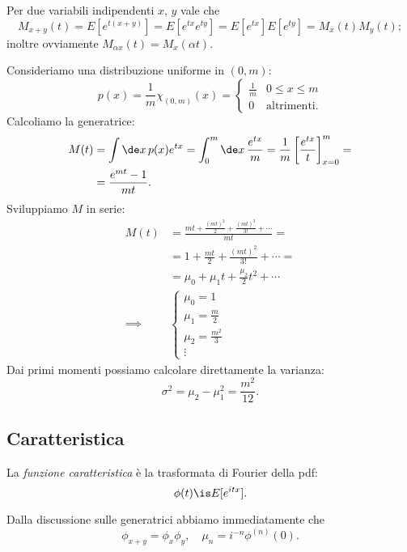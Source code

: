 Per due variabili indipendenti $x$, $y$ vale che
\begin{equation*}
	M_{x+y}(t) =
	E[e^{t(x+y)}] =
	E[e^{tx} e^{ty}] =
	E[e^{tx}] E[e^{ty}] =
	M_x(t) M_y(t);
\end{equation*}
inoltre ovviamente $M_{\alpha x}(t) = M_x(\alpha t)$.

\begin{example}
	Consideriamo una distribuzione uniforme in $(0,m)$:
	\begin{equation*}
		p(x) = \frac1m \chi_{(0,m)}(x) = \begin{cases}
			\frac 1m & 0 \le x \le m \\
			0  & \text{altrimenti.}
		\end{cases}
	\end{equation*}
	Calcoliamo la generatrice:
	\begin{align*}
		M(t) &= 
		\int \de x\, p(x) e^{tx} =
		\int_0^m \de x\, \frac{e^{tx}}{m} =
		\frac 1m \left[ \frac{e^{tx}}{t} \right]_{x=0}^m = \\
		&= \frac{e^{mt} - 1}{mt}.
	\end{align*}
	Sviluppiamo $M$ in serie:
	\begin{align*}
		M(t) &=
		\frac{mt + \frac{(mt)^2}2 + \frac{(mt)^3}{3!} + \dotsb}{mt} = \\
		&= 1 + \frac{mt}2 + \frac{(mt)^2}{3!} + \dotsb = \\
		&= \mu_0 + \mu_1t + \frac{\mu_2}2t^2 + \dotsb  \\
		\implies &\begin{cases}
			\mu_0 = 1 \\
			\mu_1 = \frac m2 \\
			\mu_2 = \frac{m^2}3 \\
			\vdots
		\end{cases}
	\end{align*}
	Dai primi momenti possiamo calcolare direttamente la varianza:
	\begin{equation*}
		\sigma^2 = \mu_2 - \mu_1^2 = \frac{m^2}{12}.
	\end{equation*}
\end{example}

\subsection{Caratteristica}

\begin{definition}
	La \emph{funzione caratteristica} è la trasformata di Fourier della pdf:
	\begin{equation*}
		\phi(t) \is E[e^{itx}].
	\end{equation*}
\end{definition}
Dalla discussione sulle generatrici abbiamo immediatamente che
\begin{equation*}
	\phi_{x+y} = \phi_x\phi_y, \quad \mu_n = i^{-n} \phi^{(n)}(0).
\end{equation*}

